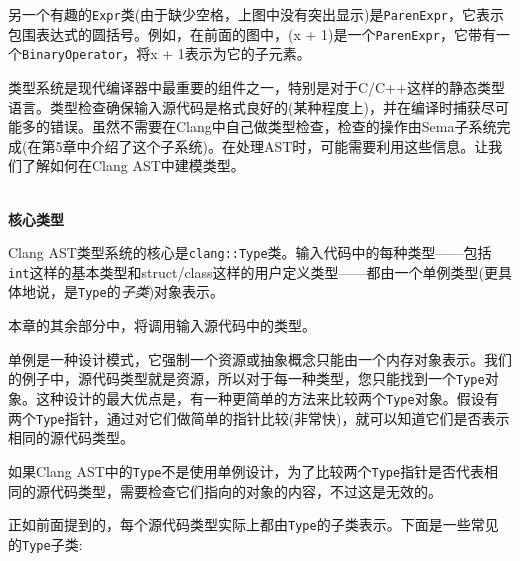 另一个有趣的\texttt{Expr}类(由于缺少空格，上图中没有突出显示)是\texttt{ParenExpr}，它表示包围表达式的圆括号。例如，在前面的图中，(x + 1)是一个\texttt{ParenExpr}，它带有一个\texttt{BinaryOperator}，将x + 1表示为它的子元素。


类型系统是现代编译器中最重要的组件之一，特别是对于C/C++这样的静态类型语言。类型检查确保输入源代码是格式良好的(某种程度上)，并在编译时捕获尽可能多的错误。虽然不需要在Clang中自己做类型检查，检查的操作由Sema子系统完成(在第5章中介绍了这个子系统)。在处理AST时，可能需要利用这些信息。让我们了解如何在Clang AST中建模类型。

\hspace*{\fill} \\ %
\noindent
\textbf{核心类型}

Clang AST类型系统的核心是\texttt{clang::Type}类。输入代码中的每种类型——包括\texttt{int}这样的基本类型和struct/class这样的用户定义类型——都由一个单例类型(更具体地说，是\texttt{Type}的\textit{子类})对象表示。

\begin{tcolorbox}[colback=blue!5!white,colframe=blue!75!black, fonttitle=\bfseries,title=术语]
\hspace*{0.7cm}本章的其余部分中，将调用输入源代码中的类型。
\end{tcolorbox}

单例是一种设计模式，它强制一个资源或抽象概念只能由一个内存对象表示。我们的例子中，源代码类型就是资源，所以对于每一种类型，您只能找到一个\texttt{Type}对象。这种设计的最大优点是，有一种更简单的方法来比较两个\texttt{Type}对象。假设有两个\texttt{Type}指针，通过对它们做简单的指针比较(非常快)，就可以知道它们是否表示相同的源代码类型。

\begin{tcolorbox}[colback=blue!5!white,colframe=blue!75!black, fonttitle=\bfseries,title=单例设计的反例]
\hspace*{0.7cm}如果Clang AST中的\texttt{Type}不是使用单例设计，为了比较两个\texttt{Type}指针是否代表相同的源代码类型，需要检查它们指向的对象的内容，不过这是无效的。
\end{tcolorbox}

正如前面提到的，每个源代码类型实际上都由\texttt{Type}的子类表示。下面是一些常见的\texttt{Type}子类:

